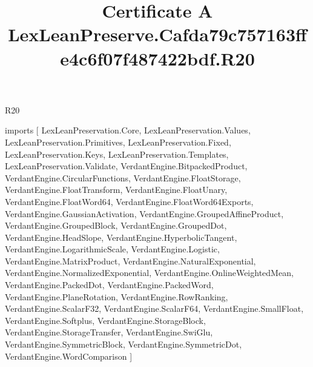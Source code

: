 \begin{lexlean}{R20}
\title{Certificate A LexLeanPreserve.Cafda79c757163ffe4c6f07f487422bdf.R20}
\begin{coremodule}
imports [
  LexLeanPreservation.Core,
  LexLeanPreservation.Values,
  LexLeanPreservation.Primitives,
  LexLeanPreservation.Fixed,
  LexLeanPreservation.Keys,
  LexLeanPreservation.Templates,
  LexLeanPreservation.Validate,
  VerdantEngine.BitpackedProduct,
  VerdantEngine.CircularFunctions,
  VerdantEngine.FloatStorage,
  VerdantEngine.FloatTransform,
  VerdantEngine.FloatUnary,
  VerdantEngine.FloatWord64,
  VerdantEngine.FloatWord64Exports,
  VerdantEngine.GaussianActivation,
  VerdantEngine.GroupedAffineProduct,
  VerdantEngine.GroupedBlock,
  VerdantEngine.GroupedDot,
  VerdantEngine.HeadSlope,
  VerdantEngine.HyperbolicTangent,
  VerdantEngine.LogarithmicScale,
  VerdantEngine.Logistic,
  VerdantEngine.MatrixProduct,
  VerdantEngine.NaturalExponential,
  VerdantEngine.NormalizedExponential,
  VerdantEngine.OnlineWeightedMean,
  VerdantEngine.PackedDot,
  VerdantEngine.PackedWord,
  VerdantEngine.PlaneRotation,
  VerdantEngine.RowRanking,
  VerdantEngine.ScalarF32,
  VerdantEngine.ScalarF64,
  VerdantEngine.SmallFloat,
  VerdantEngine.Softplus,
  VerdantEngine.StorageBlock,
  VerdantEngine.StorageTransfer,
  VerdantEngine.SwiGlu,
  VerdantEngine.SymmetricBlock,
  VerdantEngine.SymmetricDot,
  VerdantEngine.WordComparison
]


\end{coremodule}
\end{lexlean}
